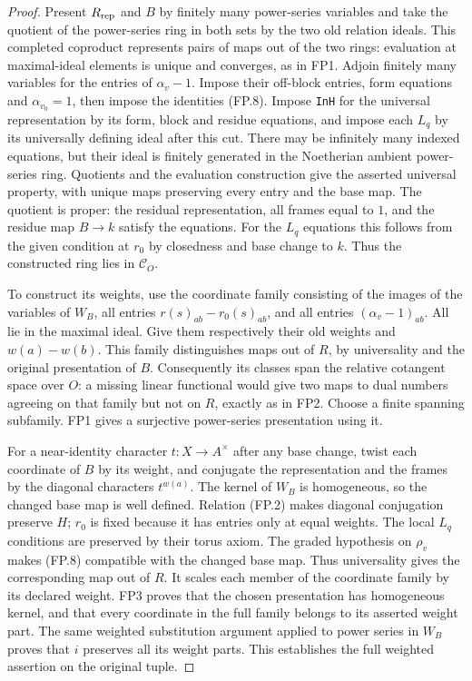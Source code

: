\begin{proof}
Present $R_{\rm rep}$ and $B$ by finitely many power-series
variables and take the quotient of the power-series ring in
both sets by the two old relation ideals.
This completed coproduct represents pairs of maps out of the
two rings: evaluation at maximal-ideal elements is unique and
converges, as in FP1.
Adjoin finitely many variables for the entries of $\alpha_v-1$.
Impose their off-block entries, form equations and
$\alpha_{v_0}=1$, then impose the identities (FP.8).
Impose \texttt{InH} for the universal representation by its form,
block and residue equations, and impose each $L_q$ by its
universally defining ideal after this cut.
There may be infinitely many indexed equations, but their ideal
is finitely generated in the Noetherian ambient power-series ring.
Quotients and the evaluation construction give the asserted
universal property, with unique maps preserving every entry and
the base map.
The quotient is proper: the residual representation, all frames
equal to $1$, and the residue map $B\to k$ satisfy the equations.
For the $L_q$ equations this follows from the given condition at
$r_0$ by closedness and base change to $k$.
Thus the constructed ring lies in $\mathcal C_O$.

To construct its weights, use the coordinate family consisting of
the images of the variables of $W_B$, all entries
$r(s)_{ab}-r_0(s)_{ab}$, and all entries $(\alpha_v-1)_{ab}$.
All lie in the maximal ideal.  Give them respectively their old
weights and $w(a)-w(b)$.  This family distinguishes maps out of
$R$, by universality and the original presentation of $B$.
Consequently its classes span the relative cotangent space over
$O$: a missing linear functional would give two maps to dual
numbers agreeing on that family but not on $R$, exactly as in FP2.
Choose a finite spanning subfamily.  FP1 gives a surjective
power-series presentation using it.

For a near-identity character $t:X\to A^\times$ after any base
change, twist each coordinate of $B$ by its weight, and conjugate
the representation and the frames by the diagonal characters
$t^{w(a)}$.  The kernel of $W_B$ is homogeneous, so the changed
base map is well defined.  Relation (FP.2) makes diagonal
conjugation preserve $H$; $r_0$ is fixed because it has entries
only at equal weights.
The local $L_q$ conditions are preserved by their torus axiom.
The graded hypothesis on $\rho_v$ makes (FP.8) compatible with
the changed base map.  Thus universality gives the corresponding
map out of $R$.
It scales each member of the coordinate family by its declared
weight.
FP3 proves that the chosen presentation has homogeneous kernel,
and that every coordinate in the full family belongs to its
asserted weight part.
The same weighted substitution argument applied to power series
in $W_B$ proves that $i$ preserves all its weight parts.
This establishes the full weighted assertion on the original tuple.
\end{proof}

